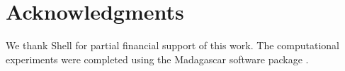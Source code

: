 \section{Acknowledgments}
We thank Shell for partial financial support of this work.  The computational experiments were completed using the Madagascar software package \cite[]{madagascar}.




